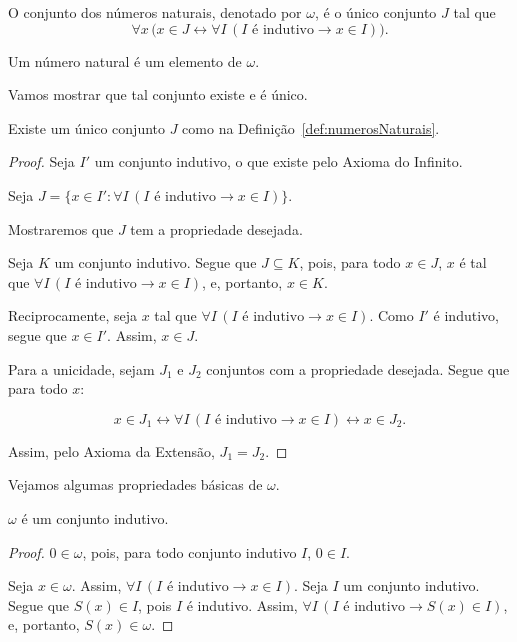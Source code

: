 \begin{definition}[$\BSTI$]\label{def:numerosNaturais}
    O conjunto dos números naturais, denotado por $\omega$, é o único conjunto $J$ tal que
    \[
        \forall x\, \bigl(x \in J \leftrightarrow \forall I\, (I \text{ é indutivo} \rightarrow x \in I)\bigr).
    \]

    Um número natural é um elemento de $\omega$.
\end{definition}

Vamos mostrar que tal conjunto existe e é único.

\begin{lemma}[$\BSTI$]\label{lem:existenciaEUnicidadeDeOmega}
    Existe um único conjunto $J$ como na Definição~\ref{def:numerosNaturais}.
\end{lemma}
\begin{proof}
    Seja $I'$ um conjunto indutivo, o que existe pelo Axioma do Infinito.

    Seja $J=\{x \in I' : \forall I\, (I \text{ é indutivo} \rightarrow x \in I)\}$.

    Mostraremos que $J$ tem a propriedade desejada.

    Seja $K$ um conjunto indutivo.
    Segue que $J\subseteq K$, pois, para todo $x\in J$, $x$ é tal que $\forall I\, (I \text{ é indutivo} \rightarrow x \in I)$, e, portanto, $x\in K$.

    Reciprocamente, seja $x$ tal que $\forall I\, (I \text{ é indutivo} \rightarrow x \in I)$.
    Como $I'$ é indutivo, segue que $x\in I'$.
    Assim, $x\in J$.

    Para a unicidade, sejam $J_1$ e $J_2$ conjuntos com a propriedade desejada.
    Segue que para todo $x$:

    \[
        x \in J_1 \leftrightarrow \forall I\, (I \text{ é indutivo} \rightarrow x \in I) \leftrightarrow x \in J_2.
    \]

    Assim, pelo Axioma da Extensão, $J_1=J_2$.
\end{proof}

Vejamos algumas propriedades básicas de $\omega$.

\begin{proposition}[$\BSTI$]\label{prop:omegaIndutivo}
    $\omega$ é um conjunto indutivo.
\end{proposition}
\begin{proof}
    $0\in\omega$, pois, para todo conjunto indutivo $I$, $0\in I$.

    Seja $x\in\omega$.
    Assim, $\forall I\, (I \text{ é indutivo} \rightarrow x \in I)$.
    Seja $I$ um conjunto indutivo.
    Segue que $S(x)\in I$, pois $I$ é indutivo.
    Assim, $\forall I\, (I \text{ é indutivo} \rightarrow S(x) \in I)$, e, portanto, $S(x)\in\omega$.
\end{proof}

